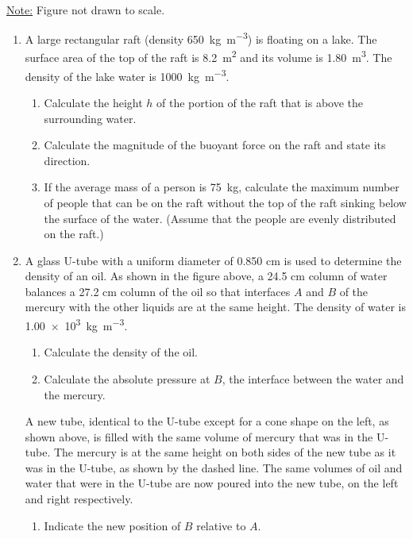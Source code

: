 \documentclass{../../../oss-classkick}
\begin{document}
\begin{center}
  \\
  \underline{Note:} Figure not drawn to scale.
\end{center}
\begin{enumerate}
\item A large rectangular raft (density \SI{650}{\kilo\gram\per\metre\cubed})
  is floating on a lake. The surface area of the top of the raft is
  \SI{8.2}{\metre\squared} and its volume is \SI{1.80}{\metre\cubed}. The
  density of the lake water is \SI{1000}{\kilo\gram\per\metre\cubed}.
  \begin{enumerate}
  \item Calculate the height $h$ of the portion of the raft that is above the
    surrounding water.
  \item Calculate the magnitude of the buoyant force on the raft and state its
    direction.
  \item If the average mass of a person is \SI{75}{\kilo\gram}, calculate the
    maximum number of people that can be on the raft without the top of the
    raft sinking below the surface of the water. (Assume that the people are
    evenly distributed on the raft.)
  \end{enumerate}
  \newpage
  
  \item A glass U-tube with a uniform diameter of 0.850 cm is used to determine
  the density of an oil. As shown in the figure above, a 24.5 cm column of
  water balances a 27.2 cm column of the oil so that interfaces $A$ and $B$ of
  the mercury with the other liquids are at the same height. The density of
  water is \SI{1.00e3}{\kilo\gram\per\metre\cubed}.
  \begin{enumerate}
  \item Calculate the density of the oil.
    \vspace{2in}
  \item Calculate the absolute pressure at $B$, the interface between the water
    and the mercury.
    \vspace{2in}
  \end{enumerate}
  A new tube, identical to the U-tube except for a cone shape on the left, as
  shown above, is filled with the same volume of mercury that was in the
  U-tube. The mercury is at the same height on both sides of the new tube as it
  was in the U-tube, as shown by the dashed line. The same volumes of oil and
  water that were in the U-tube are now poured into the new tube, on the left
  and right respectively.
  \begin{enumerate}[resume]
  \item Indicate the new position of $B$ relative to $A$.
    

\end{enumerate}
\end{enumerate}
\end{document}
